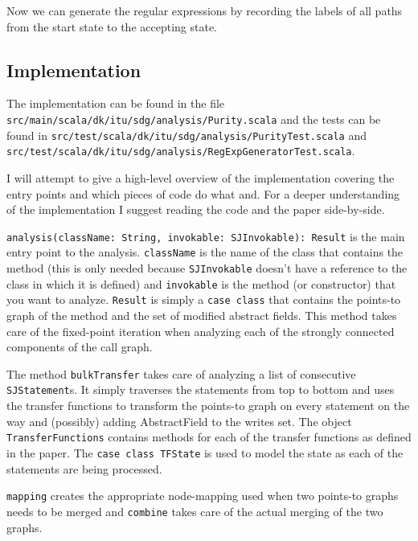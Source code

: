 \documentclass[11pt]{exam}
\begin{document}
Now we can generate the regular expressions by recording the labels of
all paths from the start state to the accepting state.

\subsection{Implementation}

The implementation can be found in the file
\texttt{src/main/scala/dk/itu/sdg/analysis/Purity.scala} and the tests
can be found in
\texttt{src/test/scala/dk/itu/sdg/analysis/PurityTest.scala} and
\texttt{src/test/scala/dk/itu/sdg/analysis/RegExpGeneratorTest.scala}.
\newline

I will attempt to give a high-level overview of the implementation
covering the entry points and which pieces of code do what and. For a
deeper understanding of the implementation I suggest reading the code
and the paper side-by-side. \newline

\texttt{analysis(className: String, invokable: SJInvokable): Result}
is the main entry point to the analysis. \texttt{className} is the
name of the class that contains the method (this is only needed
because \texttt{SJInvokable} doesn't have a reference to the class in
which it is defined) and \texttt{invokable} is the method (or
constructor) that you want to analyze. \texttt{Result} is simply a
\texttt{case class} that contains the points-to graph of the method
and the set of modified abstract fields. This method takes care of
the fixed-point iteration when analyzing each of the strongly
connected components of the call graph. \newline

The method \texttt{bulkTransfer} takes care of analyzing a list of
consecutive \texttt{SJStatement}s. It simply traverses the statements
from top to bottom and uses the transfer functions to transform the
points-to graph on every statement on the way and (possibly) adding
AbstractField to the writes set. The object \texttt{TransferFunctions}
contains methods for each of the transfer functions as defined in the
paper. The \texttt{case class TFState} is used to model the state as
each of the statements are being processed. \newline

\texttt{mapping} creates the appropriate node-mapping used when two
points-to graphs needs to be merged and \texttt{combine} takes care of
the actual merging of the two graphs. \newline
\end{document}

